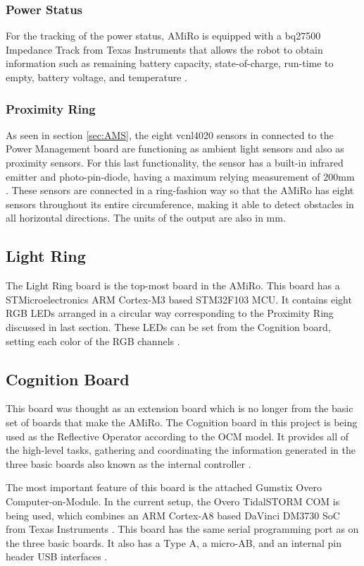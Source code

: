 \documentclass[12pt]{report}%
\begin{document}
\subsubsection{Power Status}
For the tracking of the power status, AMiRo is equipped with a bq27500 Impedance Track from Texas Instruments that allows the robot to obtain information such as remaining battery capacity, state-of-charge, run-time to empty, battery voltage, and temperature \cite{impedancepart}.

\subsubsection{Proximity Ring}
As seen in section \ref{sec:AMS}, the eight vcnl4020 sensors in connected to the Power Management board are functioning as ambient light sensors and also as proximity sensors. For this last functionality, the sensor has a built-in infrared emitter and photo-pin-diode, having a maximum relying measurement of 200mm \cite{proxsensor}. These sensors are connected in a ring-fashion way so that the AMiRo has eight sensors throughout its entire circumference, making it able to detect obstacles in all horizontal directions. The units of the output are also in mm.

\subsection{Light Ring}
The Light Ring board is the top-most board in the AMiRo. This board has a STMicroelectronics ARM Cortex-M3 based STM32F103 MCU. It contains eight RGB LEDs arranged in a circular way corresponding to the Proximity Ring discussed in last section. These LEDs can be set from the Cognition board, setting each color of the RGB channels \cite{AMiRo_paper_modular}.

\subsection{Cognition Board}
\label{sub:cogn}
This board was thought as an extension board which is no longer from the basic set of boards that make the AMiRo. The Cognition board in this project is being used as the Reflective Operator according to the OCM model. It provides all of the high-level tasks, gathering and coordinating the information generated in the three basic boards also known as the internal controller \cite{AMiRo_paper_modular}.

The most important feature of this board is the attached Gumstix Overo Computer-on-Module. In the current setup, the Overo TidalSTORM COM is being used, which combines an ARM Cortex-A8 based DaVinci DM3730 SoC from Texas Instruments \cite{AMiRo_paper_modular}. This board has the same serial programming port as on the three basic boards. It also has a Type A, a micro-AB, and an internal pin header USB interfaces \cite{AMiRo_paper_modular}.
\end{document}
